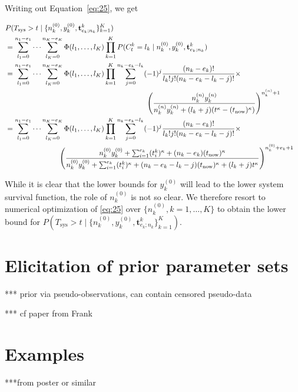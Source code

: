 \documentclass[Journal,SectionNumbers,SingleSpace,InsideFigs]{ascelike}
\newcommand{\mbf}[1]{\mathbf{#1}}
\newcommand{\uz}{^{(0)}} %
\newcommand{\un}{^{(n)}} %
\def\Tsys{T_\text{sys}}
\def\ykz{y\uz_k}
\def\ykn{y\un_k}
\def\nkz{n\uz_k}
\def\nkn{n\un_k}
\def\tnow{t_\text{now}}
\begin{document}
Writing out Equation~\eqref{eq:25}, we get
\begin{linenomath*}
\begin{align}
\lefteqn{P(\Tsys > t\mid\{\nkz,\ykz, \mbf{t}^k_{e_k;n_k}\}_{k=1}^K)} \\
 &= \sum_{l_1=0}^{n_1-e_1} \cdots \sum_{l_K=0}^{n_K-e_K} \Phi(l_1,\ldots,l_K) \prod_{k=1}^K
    P(C^k_t = l_k\mid\nkz,\ykz, \mbf{t}^k_{e_k;n_k}) \\
 &= \sum_{l_1=0}^{n_1-e_1} \cdots \sum_{l_K=0}^{n_K-e_K} \Phi(l_1,\ldots,l_K) \prod_{k=1}^K
    \sum_{j=0}^{n_k-e_k-l_k} (-1)^j \frac{(n_k - e_k)!}{l_k! j! (n_k - e_k - l_k - j)!} \times \\ & \hspace*{45ex}
    \left(\frac{\nkn\ykn}{\nkn\ykn + (l_k + j) (t^\kappa - (\tnow)^\kappa)}\right)^{\nkn + 1} \\
 &= \sum_{l_1=0}^{n_1-e_1} \cdots \sum_{l_K=0}^{n_K-e_K} \Phi(l_1,\ldots,l_K) \prod_{k=1}^K \label{eq:30}
    \sum_{j=0}^{n_k-e_k-l_k} (-1)^j \frac{(n_k - e_k)!}{l_k! j! (n_k - e_k - l_k - j)!} \times \\ & \hspace*{17ex}
    \left(\frac{\nkz\ykz + \sum_{i=1}^{e_k} (t_i^k)^\kappa + (n_k-e_k) (\tnow)^\kappa }%
               {\nkz\ykz + \sum_{i=1}^{e_k} (t_i^k)^\kappa + (n_k-e_k-l_k-j) (\tnow)^\kappa + (l_k + j) t^\kappa }\right)^{%
    \nkz + e_k + 1} 
\end{align}
\end{linenomath*}

While it is clear that the lower bounds for $\ykz$ will lead to the lower system survival function,
the role of $\nkz$ is not so clear.
We therefore resort to numerical optimization of \eqref{eq:25} over $\{\nkz, k=1,\ldots,K\}$
to obtain the lower bound for $P(\Tsys > t\mid\{\nkz,\ykz, \mbf{t}^k_{e_k;n_k}\}_{k=1}^K)$.


\section{Elicitation of prior parameter sets}

*** prior via pseudo-observations, can contain censored pseudo-data 

*** cf paper from Frank \cite{1996:coolen::cens}

\section{Examples}

***from poster or similar
\end{document}
